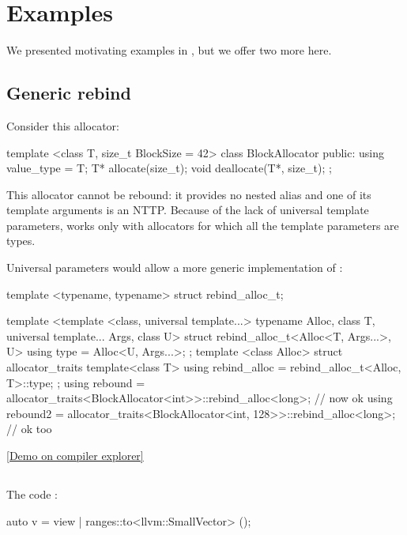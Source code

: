 \documentclass{wg21}
\begin{document}
\section{Examples}

We presented motivating examples in , but we offer two more here.

\subsection{Generic rebind}

Consider this allocator:

\begin{colorblock}
template <class T, size_t BlockSize = 42>
class BlockAllocator {
    public:
    using value_type = T;
    T* allocate(size_t);
    void deallocate(T*, size_t);
};
\end{colorblock}


This allocator cannot be rebound: it provides no  nested alias and one of its template arguments is an NTTP.
Because of the lack of universal template parameters,  works only with allocators for which all the template parameters are types.

Universal parameters would allow a more generic implementation of :


\begin{colorblock}
template <typename, typename>
struct rebind_alloc_t;

template <template <class, universal template...> typename Alloc, class T, universal template... Args, class U>
struct rebind_alloc_t<Alloc<T, Args...>, U> {
    using type = Alloc<U, Args...>;
};
template <class Alloc>
struct allocator_traits {
    template<class T>
    using rebind_alloc = rebind_alloc_t<Alloc, T>::type;
};
using rebound = allocator_traits<BlockAllocator<int>>::rebind_alloc<long>; // now ok
using rebound2 = allocator_traits<BlockAllocator<int, 128>>::rebind_alloc<long>; // ok too
\end{colorblock}

\href{https://gcc.godbolt.org/z/z7n978vdv}{[Demo on compiler explorer]}

\subsection{}

The code :

\begin{colorblock}
auto v = view | ranges::to<llvm::SmallVector> ();
\end{colorblock}
\end{document}
